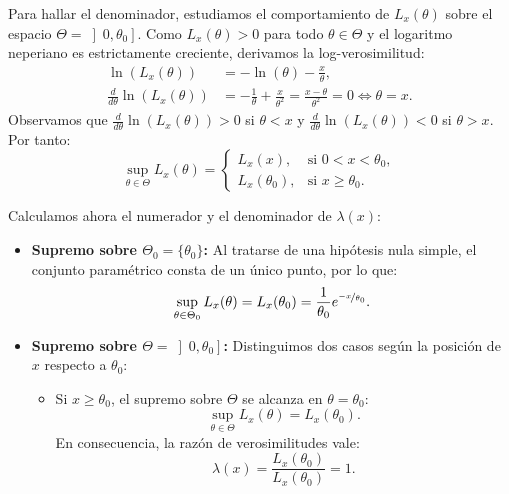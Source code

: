 \begin{ejercicio}
    Para hallar el denominador, estudiamos el comportamiento de $L_x(\theta)$ sobre el espacio $\Theta = \left]0, \theta_0\right]$. Como $L_x(\theta) > 0$ para todo $\theta \in \Theta$ y el logaritmo neperiano es estrictamente creciente, derivamos la log-verosimilitud:
    \begin{align*}
        \ln\left(L_x(\theta)\right) &= -\ln(\theta) - \frac{x}{\theta}, \\
        \frac{d}{d\theta} \ln\left(L_x(\theta)\right) &= -\frac{1}{\theta} + \frac{x}{\theta^2} = \frac{x - \theta}{\theta^2} = 0 \Longleftrightarrow \theta = x.
    \end{align*}
    Observamos que $\frac{d}{d\theta} \ln(L_x(\theta)) > 0$ si $\theta < x$ y $\frac{d}{d\theta} \ln(L_x(\theta)) < 0$ si $\theta > x$. Por tanto:
    \begin{equation*}
        \sup\limits_{\theta \in \Theta} L_x(\theta) =
        \begin{cases}
            L_x(x), & \text{si } 0 < x < \theta_0, \\
            L_x(\theta_0), & \text{si } x \geq \theta_0.
        \end{cases}
    \end{equation*}

    Calculamos ahora el numerador y el denominador de $\lambda(x)$:
    \begin{itemize}
        \item \textbf{Supremo sobre $\Theta_0 = \{\theta_0\}$:}
        Al tratarse de una hipótesis nula simple, el conjunto paramétrico consta de un único punto, por lo que:
        \begin{equation*}
            \sup\limits_{\theta \in \Theta_0} L_x(\theta) = L_x(\theta_0) = \frac{1}{\theta_0} e^{\nicefrac{-x}{\theta_0}}.
        \end{equation*}

        \item \textbf{Supremo sobre $\Theta = \left]0, \theta_0\right]$:}
        Distinguimos dos casos según la posición de $x$ respecto a $\theta_0$:
        \begin{itemize}
            \item Si $x \geq \theta_0$, el supremo sobre $\Theta$ se alcanza en $\theta = \theta_0$:
            \begin{equation*}
                \sup\limits_{\theta \in \Theta} L_x(\theta) = L_x(\theta_0).
            \end{equation*}
            En consecuencia, la razón de verosimilitudes vale:
            \begin{equation*}
                \lambda(x) = \frac{L_x(\theta_0)}{L_x(\theta_0)} = 1.
            \end{equation*}


\end{itemize}
\end{itemize}
\end{ejercicio}
